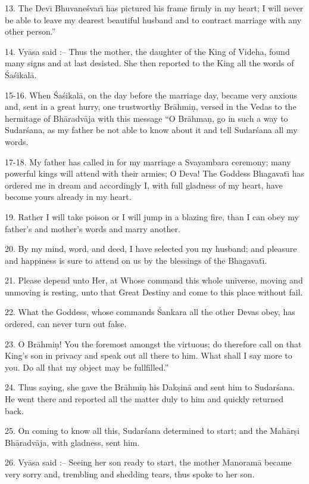 13. The Dev\={\i} Bhuvane\'svar\={\i} has pictured his frame firmly in my heart; I will never be able to leave my dearest beautiful husband and to contract marriage with any other person.''

14. Vy\=asa said :-- Thus the mother, the daughter of the King of Videha, found many signs and at last desisted. She then reported to the King all the words of \'Sa\'sikal\=a.

15-16. When \'Sa\'sikal\=a, on the day before the marriage day, became very anxious and, sent in a great hurry, one trustworthy Br\=ahmi\d{n}, versed in the Vedas to the hermitage of Bh\=aradv\=aja with this message ``O Br\=ahma\d{n}, go in such a way to Sudar\'sana, as my father be not able to know about it and tell Sudar\'sana all my words.

17-18. My father has called in for my marriage a Svayambara ceremony; many powerful kings will attend with their armies; O Deva! The Goddess Bhagavat\={\i} has ordered me in dream and accordingly I, with full gladness of my heart, have become yours already in my heart.

19. Rather I will take poison or I will jump in a blazing fire, than I can obey my father's and mother's words and marry another.

20. By my mind, word, and deed, I have selected you my husband; and pleasure and happiness is sure to attend on us by the blessings of the Bhagavat\={\i}.

21. Please depend unto Her, at Whose command this whole universe, moving and unmoving is resting, unto that Great Destiny and come to this place without fail.

22. What the Goddess, whose commands \'Sankara all the other Devas obey, has ordered, can never turn out false.

23. O Br\=ahmi\d{n}! You the foremost amongst the virtuous; do therefore call on that King's son in privacy and speak out all there to him. What shall I say more to you. Do all that my object may be fullfilled.''

24. Thus saying, she gave the Br\=ahmi\d{n} his Dak\d{s}in\=a and sent him to Sudar\'sana. He went there and reported all the matter duly to him and quickly returned back.

25. On coming to know all this, Sudar\'sana determined to start; and the Mah\=ar\d{s}i Bh\=aradv\=aja, with gladness, sent him.

26. Vy\=asa said :-- Seeing her son ready to start, the mother Manoram\=a became very sorry and, trembling and shedding tears, thus spoke to her son.

